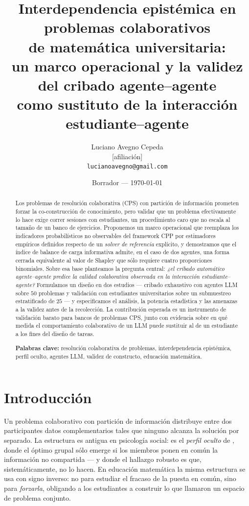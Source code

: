\documentclass[11pt,a4paper]{article}
\title{\bf Interdependencia epistémica en problemas colaborativos\\
de matemática universitaria:\\
un marco operacional y la validez del cribado agente--agente\\
como sustituto de la interacción estudiante--agente}
\author{%
  Luciano Avegno Cepeda\\
  \small{[afiliación]}\\
  \small{\texttt{lucianoavegno@gmail.com}}
}
\date{Borrador --- \today}
\theoremstyle{definition}
\theoremstyle{plain}
\theoremstyle{remark}
\begin{document}
\maketitle

\begin{abstract}
\noindent
Los problemas de resolución colaborativa (CPS) con partición de información
prometen forzar la co-construcción de conocimiento, pero validar que un problema
efectivamente lo hace exige correr sesiones con estudiantes, un procedimiento caro
que no escala al tamaño de un banco de ejercicios. Proponemos un marco operacional
que reemplaza los indicadores probabilísticos no observables del framework CPP por
estimadores empíricos definidos respecto de un \emph{solver de referencia}
explícito, y demostramos que el índice de balance de carga informativa admite,
en el caso de dos agentes, una forma cerrada equivalente al valor de Shapley que
sólo requiere cuatro proporciones binomiales. Sobre esa base planteamos la
pregunta central: \emph{¿el cribado automático agente--agente predice la calidad
colaborativa observada en la interacción estudiante--agente?} Formulamos un diseño
en dos estudios --- cribado exhaustivo con agentes LLM sobre $50$ problemas y
validación con estudiantes universitarios sobre un submuestreo estratificado de
$25$ --- y especificamos el análisis, la potencia estadística y las amenazas a la
validez antes de la recolección. La contribución esperada es un instrumento de
validación barato para bancos de problemas CPS, junto con evidencia sobre en qué
medida el comportamiento colaborativo de un LLM puede sustituir al de un
estudiante a los fines del diseño de tareas.

\vspace{0.6em}
\noindent\textbf{Palabras clave:} resolución colaborativa de problemas,
interdependencia epistémica, perfil oculto, agentes LLM, validez de constructo,
educación matemática.
\end{abstract}

\section{Introducción}

Un problema colaborativo con partición de información distribuye entre dos
participantes datos complementarios tales que ninguno alcanza la solución por
separado. La estructura es antigua en psicología social: es el \emph{perfil
oculto} de \citet{stasser1985pooling}, donde el óptimo grupal sólo emerge si los
miembros ponen en común la información no compartida --- y donde el hallazgo
robusto es que, sistemáticamente, no lo hacen. En educación matemática la misma
estructura se usa con signo inverso: no para estudiar el fracaso de la puesta en
común, sino para \emph{forzarla}, obligando a los estudiantes a construir lo que
\citet{roschelle1995construction} llamaron un espacio de problema conjunto.
\end{document}
